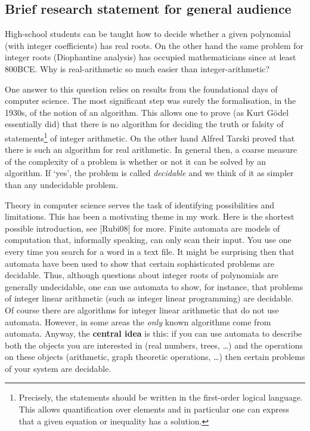 \documentclass{article}
\theoremstyle{plain} \numberwithin{equation}{section}
\theoremstyle{definition}
\begin{document}
\thispagestyle{fancy}

\noindent

\subsection*{Brief research statement for general audience}
High-school students can be taught how to decide whether a given polynomial (with integer coefficients) has real roots. On the other hand the same problem for integer roots (Diophantine analysis) has occupied mathematicians since at least 800BCE. Why is real-arithmetic so much easier than integer-arithmetic?

One answer to this question relies on results from the foundational days of computer science.
The most significant step was surely the formalisation, in the 1930s, of the notion of an algorithm. This allows one to prove (as Kurt G\"odel essentially did) that there is no algorithm for deciding the truth or falsity of statements\footnote{Precisely, the statements should be written in the first-order logical language. This allows quantification over elements and in particular one can express that a given equation or inequality has a solution.} of integer arithmetic.
On the other hand Alfred Tarski proved that there is such an algorithm for real arithmetic. In general then, a coarse measure of the complexity of a problem is whether or not it can be solved by an algorithm.  If `yes', the problem is called {\em decidable} and we think of it as simpler than any undecidable problem.

Theory in computer science serves the task of identifying possibilities and limitations. This has been a motivating theme in my work. Here is the shortest possible introduction, see [Rubi08] for more. Finite automata are models of computation that, informally speaking, can only scan their input. You use one every time you search for a word in a text file.
It might be surprising then that automata have been used to show that certain sophisticated problems are decidable. Thus, although questions about integer roots of polynomials are generally undecidable, one can use automata to show, for instance, that problems of integer linear arithmetic (such as integer linear programming) are decidable. Of course there are algorithms for integer linear arithmetic that do not use automata. However, in some areas the {\em only} known algorithms come from automata. Anyway, the {\bf central idea} is this: if you can use automata to describe both the objects you are interested in (real numbers, trees, \dots) and the operations on these objects (arithmetic, graph theoretic operations, \dots) then certain problems of your system are decidable.
\end{document}
